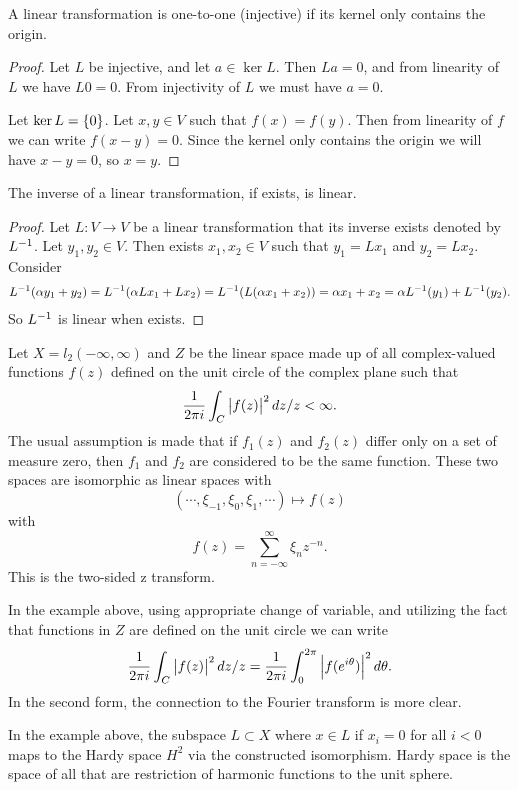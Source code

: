\begin{summary}
	A linear transformation is one-to-one (injective) if its kernel only contains the origin.
	\begin{proof}
		Let $ L $ be injective, and let $ a\in \ker L $. Then $ La = 0 $, and from linearity of $ L $ we have $ L0 = 0 $. From injectivity of $ L $ we must have $ a =0  $.
		
		Let $ \ker L = \{0\} $. Let $ x,y\in V $ such that $ f(x) = f(y) $. Then from linearity of $ f $ we can write $ f(x-y) = 0 $. Since the kernel only contains the origin we will have $ x-y= 0 $, so $ x= y $.
	\end{proof}
\end{summary}

\begin{summary}
	The inverse of a linear transformation, if exists, is linear. 
	\begin{proof}
		Let $ L:V\to V $ be a linear transformation that its inverse exists denoted by $ L^{-1} $. Let $ y_1,y_2 \in V $. Then exists $ x_1,x_2\in V $ such that $ y_1 = Lx_1 $ and $ y_2 = Lx_2 $. Consider
		\begin{align*}
			L^{-1}(\alpha y_1 + y_2) = L^{-1}(\alpha Lx_1+ Lx_2) = L^{-1}(L(\alpha x_1+x_2)) = \alpha x_1 + x_2  = \alpha L^{-1}(y_1) + L^{-1}(y_2).
		\end{align*}
		So $ L^{-1} $ is linear when exists.
	\end{proof}
\end{summary}


\begin{summary}
	Let $ X = l_2(-\infty,\infty) $ and $ Z $ be the linear space made up of all complex-valued functions $ f(z) $ defined on the unit circle of the complex plane such that
	\[ \frac{1}{2\pi i} \int_C \left|f(z)\right|^2 dz/z <\infty. \]
	The usual assumption is made that if $ f_1(z) $ and $ f_2(z) $ differ only on a set of measure zero, then $ f_1 $ and $ f_2 $ are considered to be the same function. These two spaces are isomorphic as linear spaces with
	\[ (\cdots,\xi_{-1},\xi_0, \xi_1,\cdots) \mapsto f(z) \]
	with
	\[ f(z) = \sum_{n=-\infty}^{\infty}\xi_n z^{-n}. \]
	This is the two-sided z transform.
 \end{summary}
 \begin{remark}
 	In the example above, using appropriate change of variable, and utilizing the fact that functions in $ Z $ are defined on the unit circle we can write
 	\[ \frac{1}{2\pi i}\int_C \left|f(z)\right|^2 dz/z = \frac{1}{2\pi i}\int_{0}^{2\pi}\left|f(e^{i\theta})\right|^2 d\theta. \]
 	In the second form, the connection to the Fourier transform is more clear.
 \end{remark}
 \begin{remark}
 	In the example above, the subspace $ L \subset X$ where $ x\in L $ if $ x_i=0 $ for all $ i<0 $ maps to the Hardy space $ H^2 $ via the constructed isomorphism. Hardy space is the space of all that are restriction of harmonic functions to the unit sphere.
 \end{remark}
 
